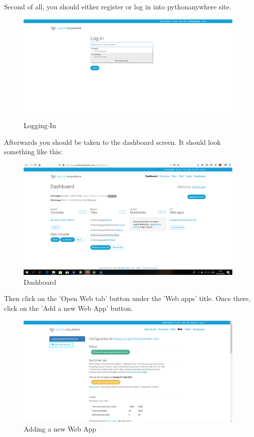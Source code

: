 				Second of all, you should either register or log in into pythonanywhere site.
				\begin{figure}[H]
					\includegraphics[width=\linewidth]{images/Deploy_1.png}
					\caption{Logging-In}
					\label{fig:deployment_1}
				\end{figure}
			
				Afterwards you should be taken to the dashboard screen. It should look something like this:
				\begin{figure}[H]
					\includegraphics[width=\linewidth]{images/Deploy_2.png}
					\caption{Dashboard}
					\label{fig:deployment_2}
				\end{figure}
				
				Then click on the 'Open Web tab' button under the 'Web apps' title. Once there, click on the 'Add a new Web App' button.
				\begin{figure}[H]
					\includegraphics[width=\linewidth]{images/Deploy_3.png}
					\caption{Adding a new Web App}
					\label{fig:deployment_3}
				\end{figure}
				
